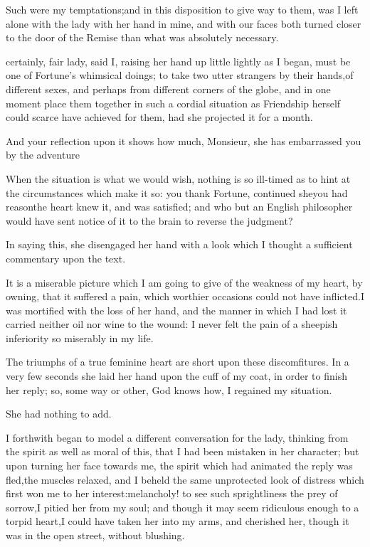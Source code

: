 \documentclass[twoside]{article}
\begin{document}
Such were my temptations;\tsk and in this disposition to give way to them,
was I left alone with the lady with her hand in mine, and with our faces
both turned closer to the door of the Remise than what was absolutely
necessary.






 certainly, fair lady, said I, raising her hand up little lightly as
I began, must be one of Fortune’s whimsical doings; to take two utter
strangers by their hands,\tsk of different sexes, and perhaps from different
corners of the globe, and in one moment place them together in such a
cordial situation as Friendship herself could scarce have achieved for
them, had she projected it for a month.

\tsk And your reflection upon it shows how much, Monsieur, she has
embarrassed you by the adventure\tsk 

When the situation is what we would wish, nothing is so ill-timed as to
hint at the circumstances which make it so: you thank Fortune, continued
she\tsk you had reason\tsk the heart knew it, and was satisfied; and who but an
English philosopher would have sent notice of it to the brain to reverse
the judgment?

In saying this, she disengaged her hand with a look which I thought a
sufficient commentary upon the text.

It is a miserable picture which I am going to give of the weakness of my
heart, by owning, that it suffered a pain, which worthier occasions could
not have inflicted.\tsk I was mortified with the loss of her hand, and the
manner in which I had lost it carried neither oil nor wine to the wound:
I never felt the pain of a sheepish inferiority so miserably in my life.

The triumphs of a true feminine heart are short upon these discomfitures.
In a very few seconds she laid her hand upon the cuff of my coat, in
order to finish her reply; so, some way or other, God knows how, I
regained my situation.

\tsk She had nothing to add.

I forthwith began to model a different conversation for the lady,
thinking from the spirit as well as moral of this, that I had been
mistaken in her character; but upon turning her face towards me, the
spirit which had animated the reply was fled,\tsk the muscles relaxed, and I
beheld the same unprotected look of distress which first won me to her
interest:\tsk melancholy! to see such sprightliness the prey of sorrow,\tsk I
pitied her from my soul; and though it may seem ridiculous enough to a
torpid heart,\tsk I could have taken her into my arms, and cherished her,
though it was in the open street, without blushing.
\end{document}
